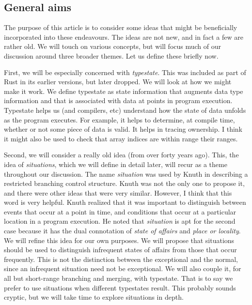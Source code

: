 \documentclass[10pt]{amsart}
\begin{document}
\subsection{General aims}

The purpose of this article is to consider some ideas that might be
beneficially incorporated into these endeavours. The ideas are not
new, and in fact a few are rather old.  We will touch on various
concepts, but will focus much of our discussion around three broader
themes.  Let us define these briefly now.

First, we will be especially concerned with \emph{typestate}.  This
was included as part of Rust in its earlier versions, but later
dropped.  We will look at how we might make it work.  We define
typestate as state information that augments data type information and
that is associated with data at points in program execution.
Typestate helps us (and compilers, etc) understand how the state of
data unfolds as the program executes.  For example, it helps to
determine, at compile time, whether or not some piece of data is
valid.  It helps in tracing ownership.  I think it might also be used
to check that array indices are within range their ranges.

Second, we will consider a really old idea (from over forty years
ago).  This, the idea of \emph{situations}, which we will define in
detail later, will recur as a theme throughout our discussion.  The
name \emph{situation} was used by Knuth in describing a restricted
branching control structure.  Knuth was not the only one to propose
it, and there were other ideas that were very similar.  However, I think
that this word is very helpful.  Knuth realized that it was important
to distinguish between events that occur at a point in time, and
conditions that occur at a particular location in a program execution.
He noted that \emph{situation} is apt for the second case because it
has the dual connotation of \emph{state of affairs} and \emph{place or
  locality}.  We will refine this idea for our own purposes.  We will
propose that situations should be used to distinguish infrequent
states of affairs from those that occur frequently.  This is not the
distinction between the exceptional and the normal, since an
infrequent situation need not be exceptional.  We will also couple it,
for all but short-range branching and merging, with typestate.  That
is to say we prefer to use situations when different typestates
result.  This probably sounds cryptic, but we will take time to
explore situations in depth.
\end{document}
